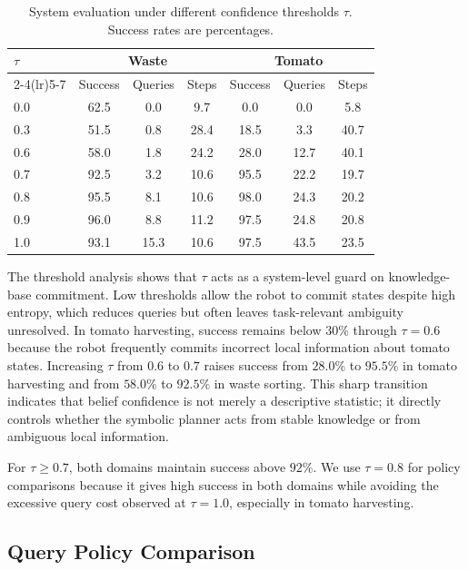\begin{table}[t]
\centering
\caption{System evaluation under different confidence thresholds $\tau$. Success rates are percentages.}
\label{tab:tau_analysis}
\small
\setlength{\tabcolsep}{3pt}
\begin{tabular}{lcccccc}
\toprule
\multirow{2}{*}{$\tau$} & \multicolumn{3}{c}{\textbf{Waste}} & \multicolumn{3}{c}{\textbf{Tomato}} \\
\cmidrule(lr){2-4}\cmidrule(lr){5-7}
& Success & Queries & Steps & Success & Queries & Steps \\
\midrule
0.0 & 62.5 & 0.0  & 9.7  & 0.0  & 0.0  & 5.8  \\
0.3 & 51.5 & 0.8  & 28.4 & 18.5 & 3.3  & 40.7 \\
0.6 & 58.0 & 1.8  & 24.2 & 28.0 & 12.7 & 40.1 \\
0.7 & 92.5 & 3.2  & 10.6 & 95.5 & 22.2 & 19.7 \\
0.8 & 95.5 & 8.1  & 10.6 & 98.0 & 24.3 & 20.2 \\
0.9 & 96.0 & 8.8  & 11.2 & 97.5 & 24.8 & 20.8 \\
1.0 & 93.1 & 15.3 & 10.6 & 97.5 & 43.5 & 23.5 \\
\bottomrule
\end{tabular}
\end{table}

The threshold analysis shows that $\tau$ acts as a system-level guard on knowledge-base commitment. Low thresholds allow the robot to commit states despite high entropy, which reduces queries but often leaves task-relevant ambiguity unresolved. In tomato harvesting, success remains below $30\%$ through $\tau=0.6$ because the robot frequently commits incorrect local information about tomato states. Increasing $\tau$ from $0.6$ to $0.7$ raises success from $28.0\%$ to $95.5\%$ in tomato harvesting and from $58.0\%$ to $92.5\%$ in waste sorting. This sharp transition indicates that belief confidence is not merely a descriptive statistic; it directly controls whether the symbolic planner acts from stable knowledge or from ambiguous local information.

For $\tau\geq0.7$, both domains maintain success above $92\%$. We use $\tau=0.8$ for policy comparisons because it gives high success in both domains while avoiding the excessive query cost observed at $\tau=1.0$, especially in tomato harvesting.

\subsection{Query Policy Comparison}
\label{sec:policy_comparison}

